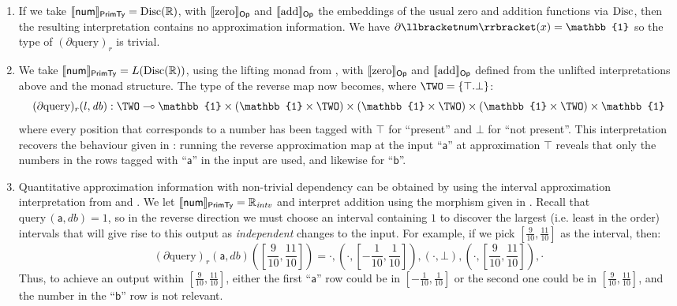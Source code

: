 \begin{enumerate}
\item If we take $\llbracket \mathsf{num} \rrbracket_{\mathsf{PrimTy}} = \mathrm{Disc}(\mathbb{R})$, with $\llbracket \mathrm{zero} \rrbracket_{\mathsf{Op}}$ and
  $\llbracket \mathrm{add} \rrbracket_{\mathsf{Op}}$ the embeddings of the usual zero and addition functions via $\mathrm{Disc}$, then the
  resulting interpretation contains no approximation information. We have
  $\partial\sem{\mathsf{num}}(x) = \mathbb{1}$ so the type of $(\partial \mathrm{query})_r$ is trivial.
\item We take $\llbracket \mathsf{num} \rrbracket_{\mathsf{PrimTy}} = L(\mathrm{Disc}(\mathbb{R}))$, using the lifting monad from
  , with $\llbracket \mathrm{zero} \rrbracket_{\mathsf{Op}}$ and
  $\llbracket \mathrm{add} \rrbracket_{\mathsf{Op}}$ defined from the unlifted interpretations above and the monad structure. The
  type of the reverse map now becomes, where $\TWO = \{\top.\bot\}$:
  \begin{equation}\label{eqn:reverse-query-approx-1}
    (\partial \mathrm{query})_r(l, \mathit{db}) : \TWO \multimap \mathbb{1} \times (\mathbb{1} \times \TWO) \times (\mathbb{1} \times \TWO) \times (\mathbb{1} \times \TWO) \times \mathbb{1}
  \end{equation}
  where every position that corresponds to a number has been tagged with $\top$ for ``present'' and $\bot$ for
  ``not present''. This interpretation recovers the behaviour given in : running
  the reverse approximation map at the input ``$\mathsf{a}$'' at approximation $\top$ reveals that only the
  numbers in the rows tagged with ``$\mathsf{a}$'' in the input are used, and likewise for ``$\mathsf{b}$''.
\item Quantitative approximation information with non-trivial dependency can be obtained by using the interval
  approximation interpretation from  and . We let
  $\llbracket \mathsf{num} \rrbracket_{\mathsf{PrimTy}} = \mathbb{R}_{\mathit{intv}}$ and interpret addition using the morphism given
  in . Recall that $\mathrm{query}\,(\mathsf{a},\mathit{db}) = 1$, so in the reverse
  direction we must choose an interval containing $1$ to discover the largest (i.e. least in the order)
  intervals that will give rise to this output as \emph{independent} changes to the input. For example, if we
  pick $[\frac{9}{10},\frac{11}{10}]$ as the interval, then:
  \begin{displaymath}
    (\partial\mathrm{query})_r(\mathsf{a},\mathit{db})([\frac{9}{10},\frac{11}{10}]) = \cdot, (\cdot,[-\frac{1}{10},\frac{1}{10}]),(\cdot,\bot),(\cdot,[\frac{9}{10},\frac{11}{10}]), \cdot
  \end{displaymath}
  Thus, to achieve an output within $[\frac{9}{10},\frac{11}{10}]$, either the first ``$\mathsf{a}$'' row
  could be in $[-\frac{1}{10},\frac{1}{10}]$ or the second one could be in $[\frac{9}{10},\frac{11}{10}]$, and
  the number in the ``$\mathsf{b}$'' row is not relevant.
\end{enumerate}


